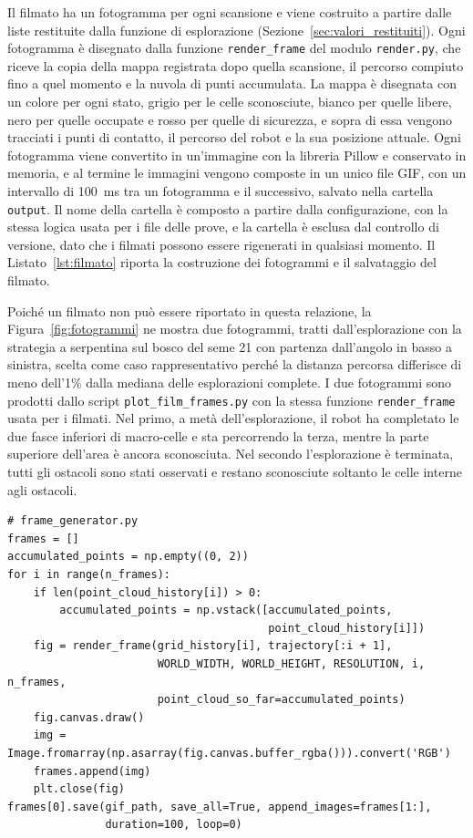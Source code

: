 Il filmato ha un fotogramma per ogni scansione e viene costruito a partire dalle liste restituite dalla funzione di esplorazione (Sezione~\ref{sec:valori_restituiti}). Ogni fotogramma è disegnato dalla funzione \texttt{render\_frame} del modulo \texttt{render.py}, che riceve la copia della mappa registrata dopo quella scansione, il percorso compiuto fino a quel momento e la nuvola di punti accumulata. La mappa è disegnata con un colore per ogni stato, grigio per le celle sconosciute, bianco per quelle libere, nero per quelle occupate e rosso per quelle di sicurezza, e sopra di essa vengono tracciati i punti di contatto, il percorso del robot e la sua posizione attuale. Ogni fotogramma viene convertito in un'immagine con la libreria Pillow e conservato in memoria, e al termine le immagini vengono composte in un unico file GIF, con un intervallo di 100~ms tra un fotogramma e il successivo, salvato nella cartella \texttt{output}. Il nome della cartella è composto a partire dalla configurazione, con la stessa logica usata per i file delle prove, e la cartella è esclusa dal controllo di versione, dato che i filmati possono essere rigenerati in qualsiasi momento. Il Listato~\ref{lst:filmato} riporta la costruzione dei fotogrammi e il salvataggio del filmato.

Poiché un filmato non può essere riportato in questa relazione, la Figura~\ref{fig:fotogrammi} ne mostra due fotogrammi, tratti dall'esplorazione con la strategia a serpentina sul bosco del seme 21 con partenza dall'angolo in basso a sinistra, scelta come caso rappresentativo perché la distanza percorsa differisce di meno dell'1\% dalla mediana delle esplorazioni complete. I due fotogrammi sono prodotti dallo script \texttt{plot\_film\_frames.py} con la stessa funzione \texttt{render\_frame} usata per i filmati. Nel primo, a metà dell'esplorazione, il robot ha completato le due fasce inferiori di macro-celle e sta percorrendo la terza, mentre la parte superiore dell'area è ancora sconosciuta. Nel secondo l'esplorazione è terminata, tutti gli ostacoli sono stati osservati e restano sconosciute soltanto le celle interne agli ostacoli.

\begin{lstlisting}[float=!htb, label=lst:filmato, caption={Costruzione dei fotogrammi e salvataggio del filmato.}]
# frame_generator.py
frames = []
accumulated_points = np.empty((0, 2))
for i in range(n_frames):
    if len(point_cloud_history[i]) > 0:
        accumulated_points = np.vstack([accumulated_points,
                                        point_cloud_history[i]])
    fig = render_frame(grid_history[i], trajectory[:i + 1],
                       WORLD_WIDTH, WORLD_HEIGHT, RESOLUTION, i, n_frames,
                       point_cloud_so_far=accumulated_points)
    fig.canvas.draw()
    img = Image.fromarray(np.asarray(fig.canvas.buffer_rgba())).convert('RGB')
    frames.append(img)
    plt.close(fig)
frames[0].save(gif_path, save_all=True, append_images=frames[1:],
               duration=100, loop=0)
\end{lstlisting}

